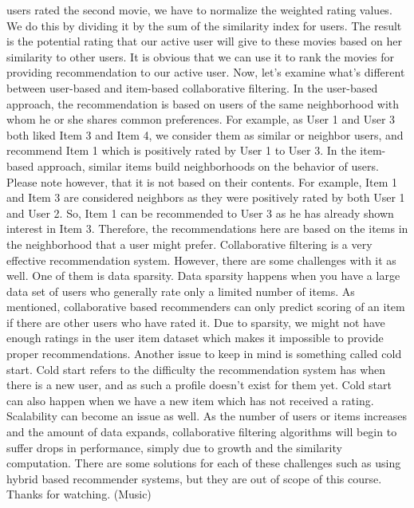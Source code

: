 users rated the second movie, we have to normalize the weighted rating values. We do this by dividing it by the sum of the similarity index for users. The result is the potential rating that our active user will give to these movies based on her similarity to other users. It is obvious that we can use it to rank the movies for providing recommendation to our active user. Now, let's examine what's different between user-based and item-based collaborative filtering. In the user-based approach, the recommendation is based on users of the same neighborhood with whom he or she shares common preferences. For example, as User 1 and User 3 both liked Item 3 and Item 4, we consider them as similar or neighbor users, and recommend Item 1 which is positively rated by User 1 to User 3. In the item-based approach, similar items build neighborhoods on the behavior of users. Please note however, that it is not based on their contents. For example, Item 1 and Item 3 are considered neighbors as they were positively rated by both User 1 and User 2. So, Item 1 can be recommended to User 3 as he has already shown interest in Item 3. Therefore, the recommendations here are based on the items in the neighborhood that a user might prefer. Collaborative filtering is a very effective recommendation system. However, there are some challenges with it as well. One of them is data sparsity. Data sparsity happens when you have a large data set of users who generally rate only a limited number of items. As mentioned, collaborative based recommenders can only predict scoring of an item if there are other users who have rated it. Due to sparsity, we might not have enough ratings in the user item dataset which makes it impossible to provide proper recommendations. Another issue to keep in mind is something called cold start. Cold start refers to the difficulty the recommendation system has when there is a new user, and as such a profile doesn't exist for them yet. Cold start can also happen when we have a new item which has not received a rating. Scalability can become an issue as well. As the number of users or items increases and the amount of data expands, collaborative filtering algorithms will begin to suffer drops in performance, simply due to growth and the similarity computation. There are some solutions for each of these challenges such as using hybrid based recommender systems, but they are out of scope of this course. Thanks for watching. (Music)
	
	